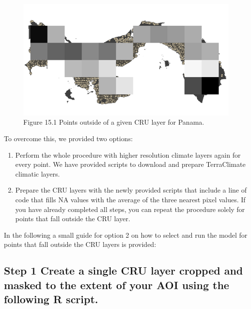 \documentclass[
  10pt,
  b5paper,
]{book}
\providecommand{\tightlist}{%
  \setlength{\itemsep}{0pt}\setlength{\parskip}{0pt}}
\begin{document}
\begin{figure}
\centering
\includegraphics{images/Figure_9.7.png}
\caption{Figure 15.1 Points outside of a given CRU layer for Panama.}
\end{figure}

To overcome this, we provided two options:

\begin{enumerate}
\def\labelenumi{\arabic{enumi}.}
\tightlist
\item
  Perform the whole procedure with higher resolution climate layers again for every point. We have provided scripts to download and prepare TerraClimate climatic layers.
\item
  Prepare the CRU layers with the newly provided scripts that include a line of code that fills NA values with the average of the three nearest pixel values. If you have already completed all steps, you can repeat the procedure solely for points that fall outside the CRU layer.
\end{enumerate}

In the following a small guide for option 2 on how to select and run the model for points that fall outside the CRU layers is provided:

\hypertarget{step-1-create-a-single-cru-layer-cropped-and-masked-to-the-extent-of-your-aoi-using-the-following-r-script.}{%
\subsection{Step 1 Create a single CRU layer cropped and masked to the extent of your AOI using the following R script.}\label{step-1-create-a-single-cru-layer-cropped-and-masked-to-the-extent-of-your-aoi-using-the-following-r-script.}}
\end{document}
